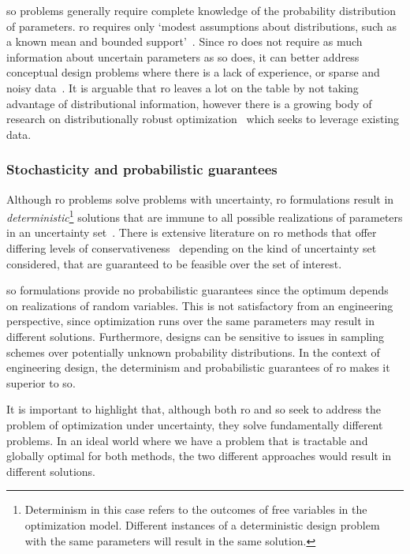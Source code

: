 \gls{so} problems generally require complete knowledge of the probability distribution of
parameters.
\gls{ro} requires only `modest assumptions  about distributions, such as a known mean and
bounded support'~\cite{Chen2007}. Since \gls{ro} does not require as much information
about uncertain parameters as \gls{so} does, it can better address conceptual design problems where there
is a lack of experience, or sparse and noisy data~\cite{Bertsimas2011}. It is arguable that \gls{ro}
leaves a lot on the table by not taking advantage of distributional information,
however there is a growing body of research on distributionally robust optimization~\cite{Bertsimas2018}
which seeks to leverage existing data.

\subsubsection{Stochasticity and probabilistic guarantees}

Although \gls{ro} problems solve problems with uncertainty,
\gls{ro} formulations result in \emph{deterministic}\footnote{Determinism in this case
refers to the outcomes of free variables in the optimization model.
Different instances of a deterministic design problem with
the same parameters will result in the same solution.} solutions that are immune
to all possible realizations of parameters in an uncertainty set~\cite{Bertsimas2011}.
There is extensive literature on \gls{ro} methods
that offer differing levels of conservativeness~\cite{Bertsimas2004}
depending on the kind of uncertainty set considered, that are guaranteed
to be feasible over the set of interest.

\gls{so} formulations provide no probabilistic guarantees
since the optimum depends on realizations of random variables\cite{Shmoys2004}.
This is not satisfactory from an engineering perspective, since
optimization runs over the same parameters may result in different
solutions. Furthermore, designs
can be sensitive to issues in sampling schemes over potentially unknown
probability distributions. In the context of engineering design, the determinism
and probabilistic guarantees of \gls{ro} makes
it superior to \gls{so}.

It is important to highlight that,
although both \gls{ro} and \gls{so} seek to address the problem
of optimization under uncertainty, they solve fundamentally different problems. In an ideal world where
we have a problem that is tractable and globally optimal for both methods, the two different
approaches would result in different solutions.

